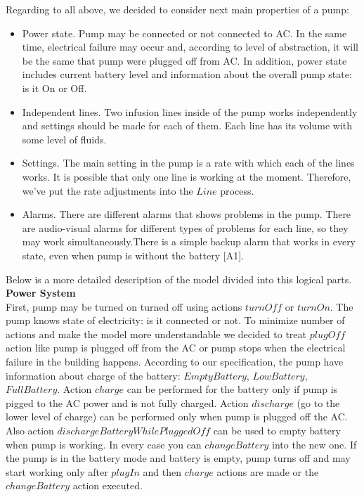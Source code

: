 \documentclass{article}
\begin{document}
Regarding to all above, we decided to consider next main properties of a pump: \\
\begin{itemize}
\item Power state. Pump may be connected or not connected to AC. In the same time, electrical failure may occur and, according to level of abstraction, it will be the same that pump were plugged off from AC. In addition, power state includes current battery level and information about the overall pump state: is it On or Off.
\item Independent lines. Two infusion lines inside of the pump works independently and settings should be made for each of them. Each line has its volume with some level of fluids. 
\item Settings. The main setting in the pump is a rate with which each of the lines works. It is possible that only one line is working at the moment. Therefore, we’ve put the rate adjustments into the $Line$ process.
\item Alarms. There are different alarms that shows problems in the pump. There are audio-visual alarms for different types of problems for each line, so they may work simultaneously.There is a simple backup alarm that works in every state, even when pump is without the battery [A1].
\end{itemize}
Below is a more detailed description of the model divided into this logical parts.\\

\textbf{Power System} \\

First, pump may be turned on turned off using actions $turnOff$ or $turnOn$. The pump knows state of electricity: is it connected or not. To minimize number of actions and make the model more understandable we decided to treat $plugOff$ action like pump is plugged off from the AC or pump stops when the electrical failure in the building happens.
According to our specification, the pump have information about charge of the battery: $EmptyBattery$, $LowBattery$, $FullBattery$. Action $charge$ can be performed for the battery only if pump is pigged to the AC power and is not fully charged. Action $discharge$ (go to the lower level of charge) can be performed only when pump is plugged off the AC. Also action $dischargeBatteryWhilePluggedOff$ can be used to empty battery when pump is working. In every case you can $changeBattery$ into the new one.
If the pump is in the battery mode and battery is empty, pump turns off and may start working only after $plugIn$ and then $charge$ actions are made or the $changeBattery$ action executed.\\
\end{document}
